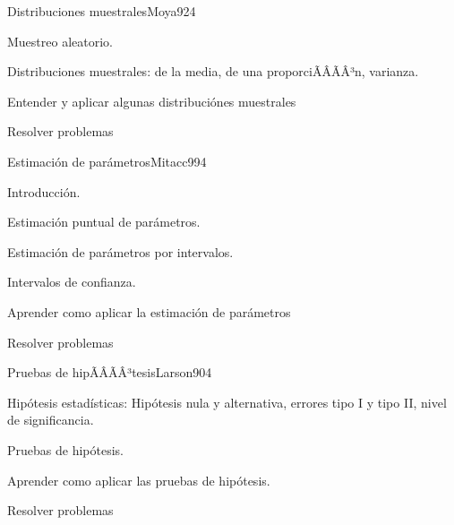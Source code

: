 \begin{sumilla}
\begin{unit}{Distribuciones muestrales}{Moya92}{4}
   \begin{topicos}
         \item  Muestreo aleatorio.
	 \item  Distribuciones muestrales: de la media, de una proporciÃÂÃÂ³n, varianza.
   \end{topicos}

   \begin{objetivos}
         \item  Entender y aplicar algunas distribuci\'ones muestrales
         \item  Resolver problemas
   \end{objetivos}
\end{unit}

\begin{unit}{Estimaci\'on de par\'ametros}{Mitacc99}{4}
   \begin{topicos}
         \item  Introducci\'on.
	 \item  Estimaci\'on puntual de par\'ametros.
	\item Estimaci\'on de par\'ametros por intervalos.
	\item Intervalos de confianza.
   \end{topicos}

   \begin{objetivos}
         \item  Aprender como aplicar la estimaci\'on de par\'ametros
         \item  Resolver problemas
   \end{objetivos}
\end{unit}

\begin{unit}{Pruebas de hipÃÂÃÂ³tesis}{Larson90}{4}
   \begin{topicos}
         \item  Hip\'otesis estad\'isticas: Hip\'otesis nula y alternativa, errores tipo I y tipo II, nivel de significancia.
	 \item  Pruebas de hip\'otesis.
   \end{topicos}

   \begin{objetivos}
         \item  Aprender como aplicar las pruebas de hip\'otesis.
         \item  Resolver problemas
   \end{objetivos}
\end{unit}

\begin{bibliografia}
\end{bibliografia}

\end{sumilla}


